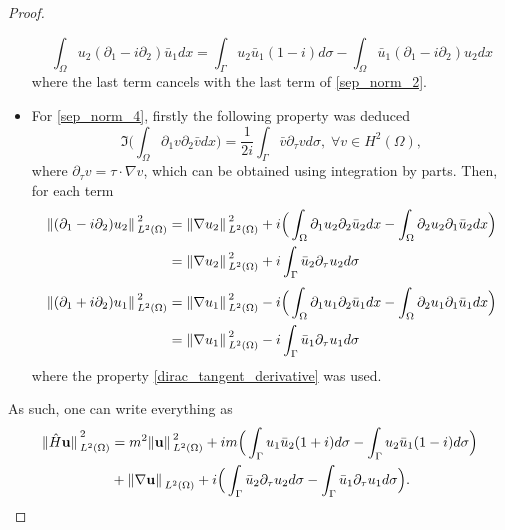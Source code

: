 \begin{proof}
\begin{itemize}
                \[
                \int_\Omega u_2(\partial_1 - i \partial_2)\bar{u}_1dx = \int_{\Gamma} u_2\bar{u}_1(1-i)d\sigma - \int_\Omega \bar{u}_1(\partial_1 - i \partial_2)u_2dx
                \]
                where the last term cancels with the last term of \eqref{sep_norm_2}.
        \item For \eqref{sep_norm_4}, firstly the following property was deduced
                \begin{equation}\label{dirac_tangent_derivative}
                \Im \Big(\int_\Omega \partial_1 v \partial_2 \bar{v}dx\Big) = \frac{1}{2 i} \int_{\Gamma} \bar{v} \partial_\tau v d \sigma, \; \forall v \in H^2(\Omega),
                \end{equation}
                where \(\partial_\tau v= \tau \cdot \nabla v\), which can be obtained using integration by parts.
                Then, for each term
                \begin{align*}
                \norm*{(\partial_1 - i \partial_2)u_2}_{L^2(\Omega)}^2 &= \norm*{\nabla u_2}_{L^2(\Omega)}^2 + i \Big(\int_\Omega \partial_1 u_2 \partial_2 \bar{u}_2dx - \int_\Omega \partial_2 u_2 \partial_1 \bar{u}_2dx\Big)\\
                & = \norm*{\nabla u_2}_{L^2(\Omega)}^2 + i\int_{\Gamma} \bar{u}_2 \partial_\tau u_2 d \sigma
                \end{align*}
                \vspace*{-1cm}
                \begin{align*}
                \norm*{(\partial_1 + i \partial_2)u_1}_{L^2(\Omega)}^2 &= \norm*{\nabla u_1}_{L^2(\Omega)}^2 - i \Big(\int_\Omega \partial_1 u_1 \partial_2 \bar{u}_1dx - \int_\Omega \partial_2 u_1 \partial_1 \bar{u}_1dx\Big)\\
                & = \norm*{\nabla u_1}_{L^2(\Omega)}^2 - i\int_{\Gamma} \bar{u}_1 \partial_\tau u_1 d \sigma
                \end{align*}
                where the property \ref{dirac_tangent_derivative} was used.
    \end{itemize}
    As such, one can write everything as
    \begin{align*}
        \norm*{\hat{H}\mathbf{u}}_{L^2(\Omega)}^2 &= m^2 \norm*{\mathbf{u}}_{L^2(\Omega)}^2 + i m \Big(\int_{\Gamma} u_1\bar{u}_2(1+i)d\sigma - \int_{\Gamma} u_2\bar{u}_1(1-i)d\sigma \Big)\\
        & + \norm*{\nabla \mathbf{u}}_{L^2(\Omega)} + i\Big( \int_{\Gamma} \bar{u}_2 \partial_\tau u_2 d \sigma -  \int_{\Gamma} \bar{u}_1 \partial_\tau u_1 d \sigma \Big).

\end{align*}
\end{proof}
